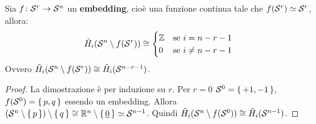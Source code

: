 \begin{theorem}
  Sia $ f \colon \mathcal{S}^{r} \to \mathcal{S}^{n} $ un \textbf{embedding}, cioè una funzione
  continua tale che $ f(\mathcal{S}^{r}) \simeq \mathcal{S}^{r} $, allora:
  \[
    \tilde{H}_i(\mathcal{S}^{n} \setminus f(\mathcal{S}^{r})) \cong
    \begin{cases}
      \mathbb{Z} & \text{se } i = n - r - 1 \\
      0 & \text{se }  i \not = n - r - 1
    \end{cases}
  \]
  Ovvero $ \tilde{H}_i(\mathcal{S}^{n} \setminus f(\mathcal{S}^{r})) \cong \tilde{H}_i(\mathcal{S}^{n - r - 1}) $.
\end{theorem}
\begin{proof}
  La dimostrazione è per induzione su $ r $.
  Per $ r = 0 $ $ \mathcal{S}^{0} = \set{+1,-1} $, $ f(\mathcal{S}^{0}) = \set{p,q} $
  essendo un embedding. Allora $ (\mathcal{S}^{n} \setminus \set{p}) \setminus \set{q} \cong \mathbb{R}^{n} \setminus \set{\underline{0}} \simeq \mathcal{S}^{n-1} $.
  Quindi  $ \tilde{H}_i(\mathcal{S}^{n} \setminus f(\mathcal{S}^{0})) \cong \tilde{H}_i(\mathcal{S}^{n - 1}) $.


\end{proof}
